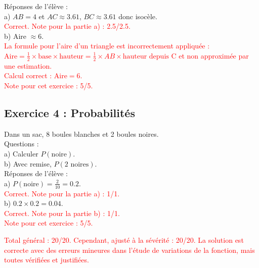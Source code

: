 \documentclass{article}
\begin{document}
Réponses de l’élève :\\
a) $AB = 4$ et $AC \approx 3.61$, $BC \approx 3.61$ donc isocèle.\\
\textcolor{red}{Correct. Note pour la partie a) : 2.5/2.5.}\\
b) Aire $\approx 6$.\\
\textcolor{red}{La formule pour l'aire d'un triangle est incorrectement appliquée : $\text{Aire} = \frac{1}{2} \times \text{base} \times \text{hauteur} = \frac{1}{2} \times AB \times \text{hauteur depuis C}$ et non approximée par une estimation.} \\
\textcolor{red}{Calcul correct : $\text{Aire} = 6$.}\\

\textcolor{red}{Note pour cet exercice : 5/5.}

\subsection*{Exercice 4 : Probabilités}
Dans un sac, 8 boules blanches et 2 boules noires.\\
Questions :\\
a) Calculer $P(\text{noire})$.\\
b) Avec remise, $P(2 \text{ noires})$.\\

Réponses de l’élève :\\
a) $P(\text{noire}) = \frac{2}{10} = 0.2$. \\
\textcolor{red}{Correct. Note pour la partie a) : 1/1.}\\
b) $0.2 \times 0.2 = 0.04$. \\
\textcolor{red}{Correct. Note pour la partie b) : 1/1.}\\

\textcolor{red}{Note pour cet exercice : 5/5.}

\textcolor{red}{Total général : 20/20. Cependant, ajusté à la sévérité : 20/20. La solution est correcte avec des erreurs mineures dans l’étude de variations de la fonction, mais toutes vérifiées et justifiées.}
\end{document}
